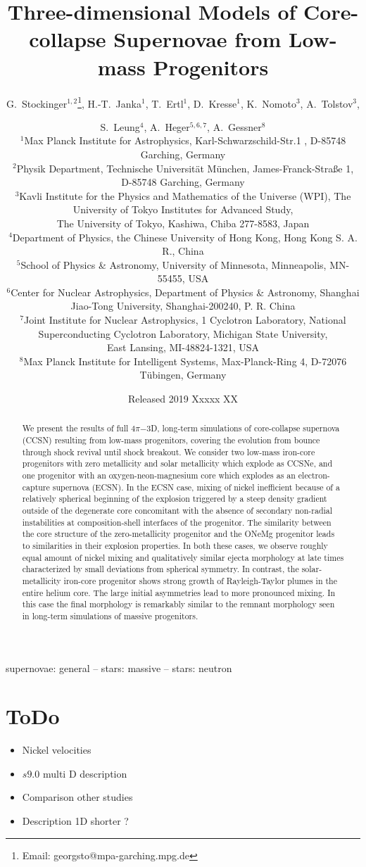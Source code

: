 \documentclass[fleqn,usenatbib]{mnras}
\title{Three-dimensional Models of Core-collapse Supernovae from Low-mass Progenitors}
\author[G. Stockinger et. al]{
 G.~Stockinger$^{1,2}$\thanks{Email: georgsto@mpa-garching.mpg.de},
 H.-T.~Janka$^1$,
 T.~Ertl$^1$,
 D.~Kresse$^1$,
 K.~Nomoto$^3$,
 A.~Tolstov$^3$,\and
 S.~Leung$^4$,
 A.~Heger$^{5,6,7}$,
 A.~Gessner$^8$
 \\
$^1$Max Planck Institute for Astrophysics, Karl-Schwarzschild-Str.1 , D-85748 Garching, Germany\\
$^2$Physik Department, Technische Universit\"at M\"unchen, James-Franck-Stra{\ss}e 1, D-85748 Garching, Germany\\
$^3$Kavli Institute for the Physics and Mathematics of the Universe (WPI), The University of Tokyo Institutes for Advanced Study,\\  \hspace{0.08cm} The University of Tokyo, Kashiwa, Chiba 277-8583, Japan\\
$^4$Department of Physics, the Chinese University of Hong Kong, Hong Kong S. A. R., China \\
$^5$School of Physics \& Astronomy, University of Minnesota, Minneapolis, MN-55455, USA \\
$^6$Center for Nuclear Astrophysics, Department of Physics \& Astronomy, Shanghai Jiao-Tong University, Shanghai-200240, P. R. China \\
$^7$Joint Institute for Nuclear Astrophysics, 1 Cyclotron Laboratory, National Superconducting Cyclotron Laboratory, Michigan State University,\\ \hspace{0.08cm} East Lansing, MI-48824-1321, USA \\
$^8$Max Planck Institute for Intelligent Systems, Max-Planck-Ring 4, D-72076 T\"ubingen, Germany \\
}
\date{Released 2019 Xxxxx XX}
\begin{document}
\label{firstpage}
\pagerange{\pageref{firstpage}--\pageref{lastpage}}
\maketitle
{}

\begin{abstract}
We present the results of full $4\pi\mathord{-}$3D, long-term simulations of core-collapse supernova (CCSN) resulting from low-mass progenitors, covering the evolution from bounce through shock revival until shock breakout. We consider two low-mass iron-core progenitors with zero metallicity and solar metallicity which explode as CCSNe, and one progenitor with an oxygen-neon-magnesium core which explodes as an electron-capture supernova (ECSN). In the ECSN case, mixing of nickel inefficient because of a relatively spherical beginning of the explosion triggered by a steep density gradient outside of the degenerate core concomitant with the absence of secondary non-radial instabilities at composition-shell interfaces of the progenitor. The similarity between the core structure of the zero-metallicity progenitor and the ONeMg progenitor leads to similarities in their explosion properties. In both these cases, we observe roughly equal amount of nickel mixing and qualitatively similar ejecta morphology at late times characterized by small deviations from spherical symmetry. In contrast, the solar-metallicity iron-core progenitor shows strong growth of Rayleigh-Taylor plumes in the entire helium core. The large initial asymmetries lead to more pronounced mixing. In this case the final morphology is remarkably similar to the remnant morphology seen in long-term simulations of massive progenitors.
\end{abstract}

\begin{keywords}
  supernovae: general -- stars: massive -- stars: neutron
\end{keywords}

\noindent

\section{ToDo}
\begin{itemize}
    \item Nickel velocities
    \item $s9.0$ multi D description
    \item Comparison other studies
    \item Description 1D shorter ?
\end{itemize}
\end{document}
